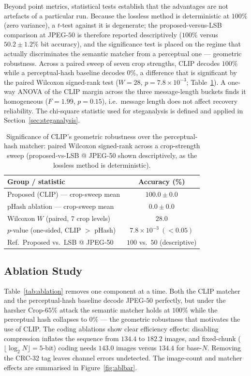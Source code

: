 \documentclass[10pt,a4paper]{article}
\theoremstyle{definition}
\begin{document}
Beyond point metrics, statistical tests establish that the advantages are not
artefacts of a particular run. Because the lossless method is deterministic at
$100\%$ (zero variance), a $t$-test against it is degenerate; the proposed-versus-LSB
comparison at JPEG-$50$ is therefore reported descriptively ($100\%$ versus
$50.2\pm1.2\%$ bit accuracy), and the significance test is placed on the regime that
actually discriminates the semantic matcher from a perceptual one --- geometric
robustness. Across a paired sweep of seven crop strengths, CLIP decodes $100\%$
while a perceptual-hash baseline decodes $0\%$, a difference that is significant by
the paired Wilcoxon signed-rank test ($W{=}28$, $p{=}7.8\times10^{-3}$;
Table~\ref{tab:signif}). A one-way ANOVA of the CLIP margin across the three
message-length buckets finds it homogeneous ($F{=}1.99$, $p{=}0.15$), i.e.\ message
length does not affect recovery reliability. The chi-square statistic used for
steganalysis is defined and applied in Section~\ref{sec:steganalysis}.

\begin{table}[t]
\centering
\caption{Significance of CLIP's geometric robustness over the perceptual-hash matcher: paired Wilcoxon signed-rank across a crop-strength sweep (proposed-vs-LSB @ JPEG-50 shown descriptively, as the lossless method is deterministic).}\label{tab:signif}
\begin{tabular}{@{}lc@{}}
\toprule
Group / statistic & Accuracy (\%) \\
\midrule
Proposed (CLIP) --- crop-sweep mean & $100.0\pm0.0$ \\
pHash ablation --- crop-sweep mean  & $0.0\pm0.0$ \\
\midrule
Wilcoxon $W$ (paired, 7 crop levels) & $28.0$ \\
$p$-value (one-sided, CLIP $>$ pHash) & $7.8\times10^{-3}\ (<0.05)$ \\
Ref.\ Proposed vs.\ LSB @ JPEG-50 & $100$ vs.\ $50$ (descriptive) \\
\bottomrule
\end{tabular}
\end{table}

\subsection{Ablation Study}\label{sec:ablation}
Table~\ref{tab:ablation} removes one component at a time. Both the CLIP matcher and
the perceptual-hash baseline decode JPEG-$50$ perfectly, but under the harsher
Crop-$65\%$ attack the semantic matcher holds at $100\%$ while the perceptual hash
collapses to $0\%$ --- the geometric robustness that motivates the use of CLIP. The
coding ablations show clear efficiency effects: disabling compression inflates the
sequence from $134.4$ to $182.2$ images, and fixed-chunk ($\lfloor\log_2 N\rfloor{=}5$-bit)
coding needs $143.0$ images versus $134.4$ for base-$N$. Removing the CRC-32 tag
leaves channel errors undetected. The image-count and matcher effects are summarised
in Figure~\ref{fig:ablbar}.
\end{document}
